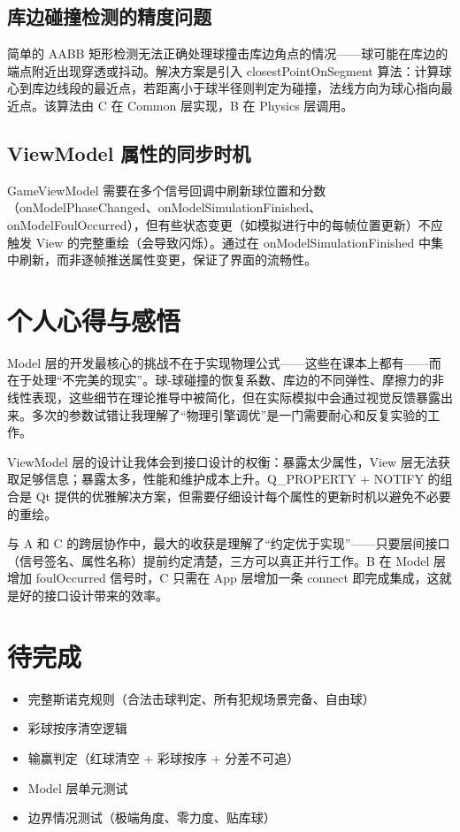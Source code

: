\documentclass[11pt]{ctexart}
\begin{document}
\subsection{库边碰撞检测的精度问题}

简单的 AABB 矩形检测无法正确处理球撞击库边角点的情况——球可能在库边的端点附近出现穿透或抖动。解决方案是引入 closestPointOnSegment 算法：计算球心到库边线段的最近点，若距离小于球半径则判定为碰撞，法线方向为球心指向最近点。该算法由 C 在 Common 层实现，B 在 Physics 层调用。

\subsection{ViewModel 属性的同步时机}

GameViewModel 需要在多个信号回调中刷新球位置和分数（onModelPhaseChanged、onModelSimulationFinished、onModelFoulOccurred），但有些状态变更（如模拟进行中的每帧位置更新）不应触发 View 的完整重绘（会导致闪烁）。通过在 onModelSimulationFinished 中集中刷新，而非逐帧推送属性变更，保证了界面的流畅性。

\section{个人心得与感悟}

Model 层的开发最核心的挑战不在于实现物理公式——这些在课本上都有——而在于处理“不完美的现实”。球-球碰撞的恢复系数、库边的不同弹性、摩擦力的非线性表现，这些细节在理论推导中被简化，但在实际模拟中会通过视觉反馈暴露出来。多次的参数试错让我理解了“物理引擎调优”是一门需要耐心和反复实验的工作。

ViewModel 层的设计让我体会到接口设计的权衡：暴露太少属性，View 层无法获取足够信息；暴露太多，性能和维护成本上升。Q\_PROPERTY + NOTIFY 的组合是 Qt 提供的优雅解决方案，但需要仔细设计每个属性的更新时机以避免不必要的重绘。

与 A 和 C 的跨层协作中，最大的收获是理解了“约定优于实现”——只要层间接口（信号签名、属性名称）提前约定清楚，三方可以真正并行工作。B 在 Model 层增加 foulOccurred 信号时，C 只需在 App 层增加一条 connect 即完成集成，这就是好的接口设计带来的效率。

\section{待完成}

\begin{itemize}
\item 完整斯诺克规则（合法击球判定、所有犯规场景完备、自由球）
\item 彩球按序清空逻辑
\item 输赢判定（红球清空 + 彩球按序 + 分差不可追）
\item Model 层单元测试
\item 边界情况测试（极端角度、零力度、贴库球）
\end{itemize}
\end{document}
